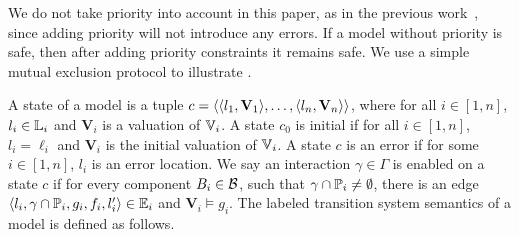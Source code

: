 \documentclass[conference]{IEEEtran}
\begin{document}
We do not take priority into account in this paper, as in the previous work~\cite{dfinder10,tgc15},
since adding priority will not introduce any errors.
If a model without priority is safe, then after adding priority constraints it remains safe.
We use a simple mutual exclusion protocol to illustrate \BIP.

%

A state of a \BIP model is a tuple $c = \langle \langle l_{1}, \mathbf{V}_{1} \rangle, \ldots, \langle l_{n}, \mathbf{V}_{n} \rangle \rangle $,
where for all $i \in [1,n] $, $l_i \in \mathbb{L}_{i} $ and $\mathbf{V}_i $ is a valuation of $\mathbb{V}_{i}$.
%
A state $c_{0}$ is initial if for all $i \in [1,n]$,
$l_i = \ell_{i}$ and $\mathbf{V}_{i}$ is the initial valuation of $\mathbb{V}_{i}$.
%
A state $c$ is an error if for some $i \in [1,n]$, $l_{i}$ is an error location.
%
We say an interaction $\gamma \in \Gamma$ is enabled on a state $c$ if
for every component $B_{i} \in \mathcal{B}$,
such that $\gamma \cap \mathbb{P}_{i} \neq \emptyset$,
%
there is an edge $\langle{l_i, \gamma \cap \ensuremath{\mathbb{P}_{i}}, g_i, f_i, l_{i}' }\rangle \in \mathbb{E}_{i}$
and  $\mathbf{V}_{i} \models g_i $.
%
The labeled transition system semantics of a \BIP model is defined as follows.
\end{document}
